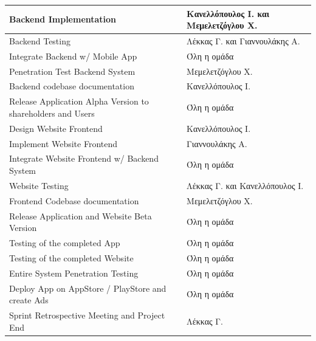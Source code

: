 \documentclass{../ol-softwaremanual}
\begin{document}
\begin{longtable}{| p{} | p{} |}
		\hline
		\en Backend Implementation \gr       &  Κανελλόπουλος Ι. και Μεμελετζόγλου Χ.         \\
		\hline
		\en Backend Testing \gr       & Λέκκας Γ. και Γιαννουλάκης Α.       \\
		\hline
		\en Integrate Backend w/ Mobile App \gr       &  Όλη η ομάδα         \\
		\hline
		\en Penetration Test Backend System \gr       &  Μεμελετζόγλου Χ.        \\
		\hline
		\en Backend codebase documentation \gr       &  Κανελλόπουλος Ι.        \\
		\hline
		\en Release Application Alpha Version to shareholders and Users \gr       &  Όλη η ομάδα        \\
		\hline
		\en Design Website Frontend \gr       &  Κανελλόπουλος Ι.        \\
		\hline
		\en Implement Website Frontend \gr       &  Γιαννουλάκης Α.        \\
		\hline
		\en Integrate Website Frontend w/ Backend System \gr       &  Όλη η ομάδα        \\
		\hline
		\en Website Testing \gr       &  Λέκκας Γ. και Κανελλόπουλος Ι.       \\
		\hline
		\en Frontend Codebase documentation \gr       &  Μεμελετζόγλου Χ.       \\
		\hline
		\en Release Application and Website Beta Version \gr       &  Όλη η ομάδα        \\
		\hline
		\en Testing of the completed App \gr       &  Όλη η ομάδα        \\
		\hline
		\en Testing of the completed Website \gr       &   Όλη η ομάδα        \\
		\hline
		\en Entire System Penetration Testing \gr       &   Όλη η ομάδα        \\
		\hline
		\en Deploy App on AppStore / PlayStore and create Ads \gr       &   Όλη η ομάδα       \\
		\hline
		\en Sprint Retrospective Meeting and Project End \gr       &  Λέκκας Γ.        \\
		\hline
	\end{longtable}
	
	\vspace{30pt}
	
	\newpage
	
	
	\vspace{20pt}
	
\end{document}
